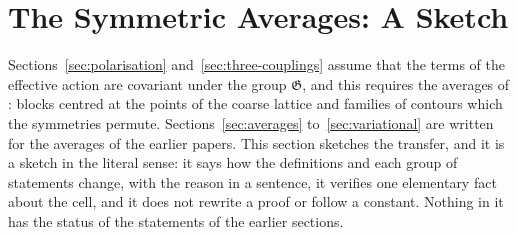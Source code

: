 \documentclass[11pt]{preprint}
\numberwithin{equation}{section}
\theoremstyle{definition}
\theoremstyle{remark}
\theoremstyle{plain}
\begin{document}
\section{The Symmetric Averages: A Sketch}\label{sec:symmetric-averages}

Sections~\ref{sec:polarisation} and~\ref{sec:three-couplings} assume that the terms of the effective action are covariant under the group $\mathfrak G$, and this requires the averages of \cite{BalabanRG1}: blocks centred at the points of the coarse lattice and families of contours which the symmetries permute. Sections~\ref{sec:averages} to~\ref{sec:variational} are written for the averages of the earlier papers. This section sketches the transfer, and it is a sketch in the literal sense: it says how the definitions and each group of statements change, with the reason in a sentence, it verifies one elementary fact about the cell, and it does not rewrite a proof or follow a constant. Nothing in it has the status of the statements of the earlier sections.
\end{document}
